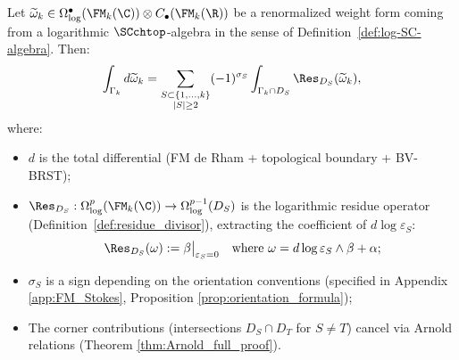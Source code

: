 \begin{theorem}
\label{thm:stokes_cluster}
Let $\widetilde{\omega}_k \in \Omega^{\bullet}_{\log}(\FM_k(\C)) \otimes C_\bullet(\FM_k(\R))$ be a renormalized weight form coming from a logarithmic $\SCchtop$-algebra in the sense of Definition~\ref{def:log-SC-algebra}. Then:
\[
\int_{\Gamma_k} d\widetilde{\omega}_k = \sum_{\substack{S \subset \{1, \ldots, k\} \\ |S| \geq 2}} (-1)^{\sigma_S} \int_{\Gamma_k \cap D_S} \Res_{D_S}(\widetilde{\omega}_k),
\]
where:
\begin{itemize}
\item $d$ is the total differential (FM de Rham + topological boundary + BV-BRST);

\item $\Res_{D_S} : \Omega^{p}_{\log}(\FM_k(\C)) \to \Omega^{p-1}_{\log}(D_S)$ is the logarithmic residue operator (Definition~\ref{def:residue_divisor}), extracting the coefficient of $d\log\varepsilon_S$:
\[
\Res_{D_S}(\omega) := \beta\big|_{\varepsilon_S = 0} \quad \text{where } \omega = d\log\varepsilon_S \wedge \beta + \alpha;
\]

\item $\sigma_S$ is a sign depending on the orientation conventions (specified in Appendix \ref{app:FM_Stokes}, Proposition \ref{prop:orientation_formula});

\item The corner contributions (intersections $D_S \cap D_T$ for $S \neq T$) cancel via Arnold relations (Theorem \ref{thm:Arnold_full_proof}).
\end{itemize}
\end{theorem}

